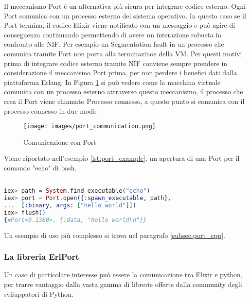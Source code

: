 Il meccanismo Port è un alternativa più sicura per
integrare codice esterno. Ogni Port comunica con un
processo esterno del sistema operativo.
In questo caso se il Port termina, il codice Elixir
viene notificato con un messaggio e può agire di conseguenza
continuando permettendo di avere un interazione robusta
in confronto alle NIF. Per esempio un Segmentation fault
in un processo che comunica tramite Port non porta alla
terminazinoe della VM. Per questi motivi prima di integrare
codice esterno tramite NIF conviene sempre prendere in considerazione
il meccanismo Port prima, per non perdere i benefici dati dalla
piattaforma Erlang. In Figura \ref{fig:port_communication}
si può vedere come la macchina virtuale comunica con un
processo esterno attraverso questo meccanismo, il processo che
crea il Port viene chiamato Processo connesso, a questo punto
si comunica con il processo connesso in due modi:

\begin{figure}[!htp]
    \centering
    \texttt{[image: images/port\_communication.png]}
	\caption{Comunicazione con Port \cite{ErlangPo88:online}}
  	\label{fig:port_communication}
\end{figure}

Viene riportato nell'esempio \ref{lst:port_example},
un apertura di una Port per il comando "echo" di bash.

\begin{lstlisting}[language=elixir,captionpos=b
	caption={Comando echo con Port},label={lst:port_example}]

iex> path = System.find_executable("echo")
iex> port = Port.open({:spawn_executable, path},
...  [:binary, args: ["hello world"]])
iex> flush()
{#Port<0.1380>, {:data, "hello world\n"}}	
\end{lstlisting}

Un esempio di uso più complesso si trova nel paragrafo \ref{subsec:port_cpp}.
\subsubsection{La libreria ErlPort}
Un caso di particolare interesse può essere la comunicazione
tra Elixir e python, per 
trarre vantaggio dalla vasta gamma di librerie offerte dalla
community degli sviluppatori di Python.

